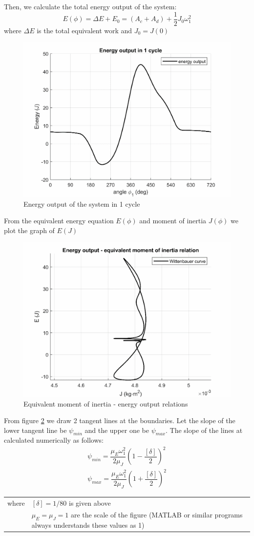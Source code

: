 Then, we calculate the total energy output of the system:
\begin{equation}
	E(\phi)=\Delta E + E_0 = (A_c+A_d) + \dfrac{1}{2}J_0\omega_1^2
\end{equation}
where $ \Delta E $ is the total equivalent work and $ J_0 = J(0)$
\begin{figure}
	\centering
	\includegraphics[width=0.6\linewidth]{20}
	\caption{Energy output of the system in 1 cycle}
	\label{fig:20}
\end{figure}

From the equivalent energy equation $ E(\phi) $ and moment of inertia $ J(\phi) $ we plot the graph of $ E(J) $
\begin{figure}[h]
	\centering
	\includegraphics[width=0.6\linewidth]{21}
	\caption{Equivalent moment of inertia - energy output relations}
	\label{fig:21}
\end{figure}

From figure \ref{fig:21} we draw 2 tangent lines at the boundaries. Let the slope of the lower tangent line be $ \psi_{min} $ and the upper one be $ \psi_{max} $. The slope of the lines at calculated numerically as follows:
\begin{equation}
\begin{array}{c}
\psi_{min}=\dfrac{\mu_E\omega_1^2}{2\mu_J}\left(1-\dfrac{[\delta]}{2}\right)^2\\
\psi_{max}=\dfrac{\mu_E\omega_1^2}{2\mu_J}\left(1+\dfrac{[\delta]}{2}\right)^2
\end{array}
\end{equation}
\begin{tabular}{p{2cm}p{13.5cm}}
	where & $ [\delta]=1/80 $ is given above\\
	 & $ \mu_E=\mu_J =1$ are the scale of the figure (MATLAB\textup{\textregistered} or similar programs always understands these values as 1)
\end{tabular}

